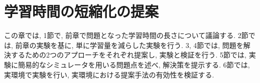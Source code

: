 \chapter{学習時間の短縮化の提案}
\label{chap:experiments}
この章では, 1節で, 前章で問題となった学習時間の長さについて議論する. 2節では, 前章の実験を基に, 単に学習量を減らした実験を行う. 3, 4節では, 問題を解決するための2つのアプローチをそれぞれ提案し, 実験と検証を行う. 5節では, 実験に簡易的なシミュレータを用いる問題点を述べ, 解決策を提示する. 6節では, 実環境で実験を行い, 実環境における提案手法の有効性を検証する.  
%
%
%
% 



%
